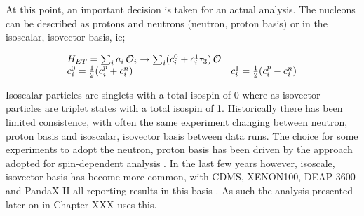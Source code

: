 \par
At this point, an important decision is taken for an actual analysis.
The nucleons can be described as protons and neutrons ({neutron, proton} basis) or in the {isoscalar, isovector} basis, ie;

\begin{equation}
\begin{array}{lcl}
    H_{ET} = \sum_i a_i \operatorname{\mathcal{O}}_i \rightarrow \sum_i (c_i^0 + c_i^1 \tau_3)\operatorname{\mathcal{O}} \\
    c_i^0 = \frac{1}{2}(c_i^p + c_i^n) & c_i^1 = \frac{1}{2}(c_i^p - c_i^n)
\end{array}
\label{eq:EFT_Operators}
\end{equation}

Isoscalar particles are singlets with a total isospin of 0 where as isovector particles are triplet states with a total isospin of 1.
Historically there has been limited consistence, with often the same experiment changing between {neutron, proton} basis and {isoscalar, isovector} basis between data runs.
The choice for some experiments to adopt the {neutron, proton} basis has been driven by the approach adopted for spin-dependent analysis .
In the last few years however, {isoscale, isovector} basis has become more common, with CDMS, XENON100, DEAP-3600 and PandaX-II all reporting results in this basis \cite{cdms_eft_ref,xenon100_eft_ref,deap3600_eft_ref,pandax_2_eft_ref}.
As such the analysis presented later on in Chapter XXX uses this.



